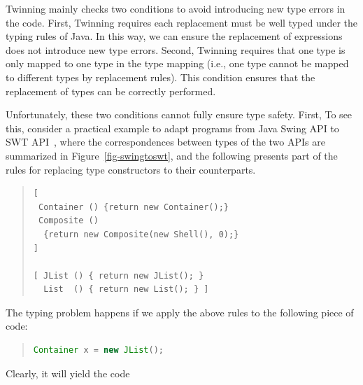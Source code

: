 Twinning mainly checks two conditions to avoid introducing new type errors
in the code. First, Twinning requires each replacement must be
well typed under the typing rules of Java. In this way, we can
ensure the replacement of expressions does not introduce new type 
errors. Second, Twinning requires that one type is only mapped to
one type in the type mapping (i.e., one type cannot be mapped to different types by 
replacement rules). This condition ensures that the replacement of
types can be correctly performed.

Unfortunately, these two conditions cannot fully ensure type safety. 
First,  
%
To see this, consider a
practical example to adapt
programs from Java Swing API to SWT API~\cite{icsm2010}, where 
 the correspondences between types of
the two APIs are summarized in Figure~\ref{fig-swingtoswt},
and the following presents part of the rules for replacing 
type constructors to their counterparts.
\begin{quote}
\begin{lstlisting}
[ 
 Container () {return new Container();}
 Composite () 
  {return new Composite(new Shell(), 0);}
]

[ JList () { return new JList(); } 
  List  () { return new List(); } ]
\end{lstlisting}
\end{quote}
%
The typing problem happens if we apply the above rules to the following piece of code:
\begin{quote}
\begin{lstlisting}[language=Java]
Container x = new JList();
\end{lstlisting}
\end{quote}
Clearly, it will yield the code
%
